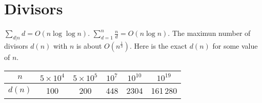 \section{Divisors}
	$\sum_{d|n} d = O(n \log \log n)$.
    $\sum_{d = 1} ^ {n} \frac{n}{d} = O(n \log n)$.
    The maximun number of divisors $d(n)$ with $n$ is about $O(n^{\frac{1}{3}})$. Here is the exact $d(n)$ for some value of $n$.
    \begin{tabular}{|c|c|c|c|c|c|}
        \hline
        $n$    & $5 \times 10^4$  & $5 \times 10^5$ & $10^7$ & $10^{10}$ & $10^{19}$  \\ \hline
        $d(n)$ & 100              & 200             & 448    & 2304   & 161\,280 \\ \hline
    \end{tabular}
